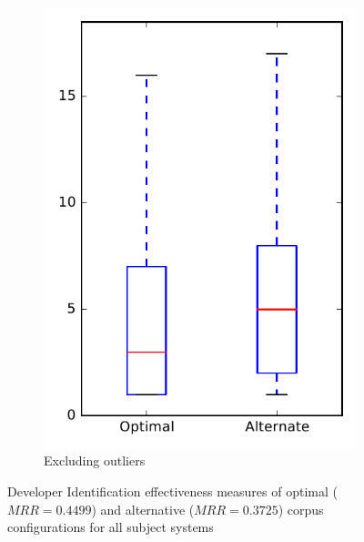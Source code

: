 \begin{figure}
\begin{subfigure}{.4\textwidth}
        \includegraphics[height=0.4\textheight]{figures/combo/dit_rq2_overview_no_outlier}
        \caption{Excluding outliers}\label{fig:combo:dit:rq2:overview_no_outlier}
    \end{subfigure}
\caption{Developer Identification effectiveness measures of optimal ($MRR=0.4499$) and alternative ($MRR=0.3725$) corpus configurations for all subject systems}
\label{fig:combo:dit:rq2:overview}
\end{figure}
